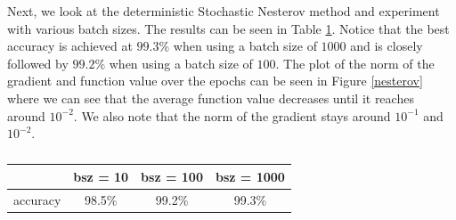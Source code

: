 \documentclass[12pt]{article}%
\begin{document}
Next, we look at the deterministic Stochastic Nesterov method and experiment with various batch sizes. The results can be seen in Table \ref{nesterov-table}. Notice that the best accuracy is achieved at $99.3\%$ when using a batch size of $1000$ and is closely followed by $99.2\%$ when using a batch size of $100$. The plot of the norm of the gradient and function value over the epochs can be seen in Figure \ref{nesterov} where we can see that the average function value decreases until it reaches around $10^{-2}$. We also note that the norm of the gradient stays around $10^{-1}$ and $10^{-2}$.

\begin{table}[h!]
    \centering
    \begin{tabular}{c|c|c|c}
        &  bsz = 10& bsz = 100 &  bsz = 1000  \\ \hline
        accuracy &  98.5\% &  99.2\%&  99.3\%  \\
    \end{tabular}
    \caption{}
    \label{nesterov-table}
\end{table}
\end{document}
